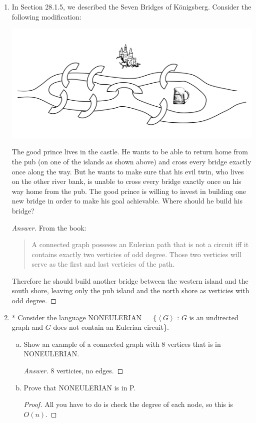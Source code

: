 \documentclass[10pt]{article}
\newcommand{\brackets}[1]{\left< #1 \right>}
\begin{document}
\begin{enumerate}[1)]

\item
In Section 28.1.5, we described the Seven Bridges of Königsberg.  Consider the following modification:\\

\begin{center}
\includegraphics[scale=.25]{images/bridges.png}
\end{center}

The good prince lives in the castle.  He wants to be able to return home from the pub (on one of the islands as
shown above) and cross every bridge exactly once along the way.  But he wants to make sure that his evil twin,
who lives on the other river bank, is unable to cross every bridge exactly once on his way home from the pub.  The
good prince is willing to invest in building one new bridge in order to make his goal achievable.  Where should he
build his bridge?
\begin{proof}[Answer]
From the book:
\begin{quote}
A connected graph posseses an Eulerian path that is not a circuit iff it contains exactly two verticies of odd degree.  Those two verticies will serve as the first and last verticies of the path.
\end{quote}
Therefore he should build another bridge between the western island and the south shore, leaving only the pub island and the north shore as verticies with odd degree.
\end{proof}

\pagebreak

\item
* Consider the language NONEULERIAN $= \{\brackets{G}$ : $G$ is an undirected graph and $G$ does not contain an Eulerian
circuit\}.
\begin{enumerate}[a)]
\item
Show an example of a connected graph with 8 vertices that is in NONEULERIAN.
\begin{proof}[Answer]
8 verticies, no edges.
\end{proof}
\item
Prove that NONEULERIAN is in P.
\begin{proof}[Proof]
All you have to do is check the degree of each node, so this is $O(n)$.
\end{proof}
\end{enumerate}


\end{enumerate}
\end{document}
